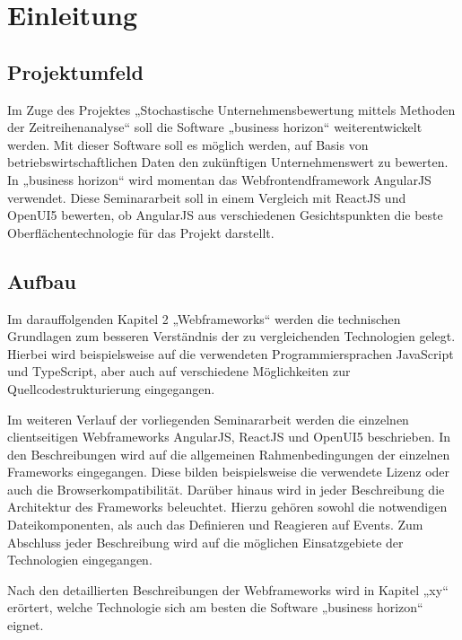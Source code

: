 
\chapter{Einleitung}

\section{Projektumfeld}

Im Zuge des Projektes „Stochastische Unternehmensbewertung mittels Methoden der Zeitreihenanalyse“ soll die Software „business horizon“ weiterentwickelt werden. Mit dieser Software soll es möglich werden, auf Basis von betriebswirtschaftlichen Daten den zukünftigen Unternehmenswert zu bewerten. In „business horizon“ wird momentan das Webfrontendframework AngularJS verwendet. Diese Seminararbeit soll in einem Vergleich mit ReactJS und OpenUI5 bewerten, ob AngularJS aus verschiedenen Gesichtspunkten die  beste Oberflächentechnologie für das Projekt darstellt. 

\section{Aufbau}

Im darauffolgenden Kapitel 2 „Webframeworks“ werden die technischen Grundlagen zum besseren Verständnis der zu vergleichenden Technologien  gelegt. Hierbei wird beispielsweise auf die verwendeten Programmiersprachen JavaScript und TypeScript, aber auch auf verschiedene Möglichkeiten zur Quellcodestrukturierung eingegangen. 

Im weiteren Verlauf der vorliegenden Seminararbeit werden die einzelnen clientseitigen Webframeworks AngularJS, ReactJS und OpenUI5 beschrieben. In den Beschreibungen wird auf die allgemeinen Rahmenbedingungen der einzelnen Frameworks eingegangen. Diese bilden beispielsweise die verwendete Lizenz oder auch die Browserkompatibilität. Darüber hinaus wird in jeder Beschreibung die Architektur des Frameworks beleuchtet. Hierzu gehören sowohl die notwendigen Dateikomponenten, als auch das Definieren und Reagieren auf Events. Zum Abschluss jeder Beschreibung wird auf die möglichen Einsatzgebiete der Technologien eingegangen.

Nach den detaillierten Beschreibungen der Webframeworks wird in Kapitel „xy“ erörtert, welche Technologie sich am besten die Software „business horizon“ eignet.